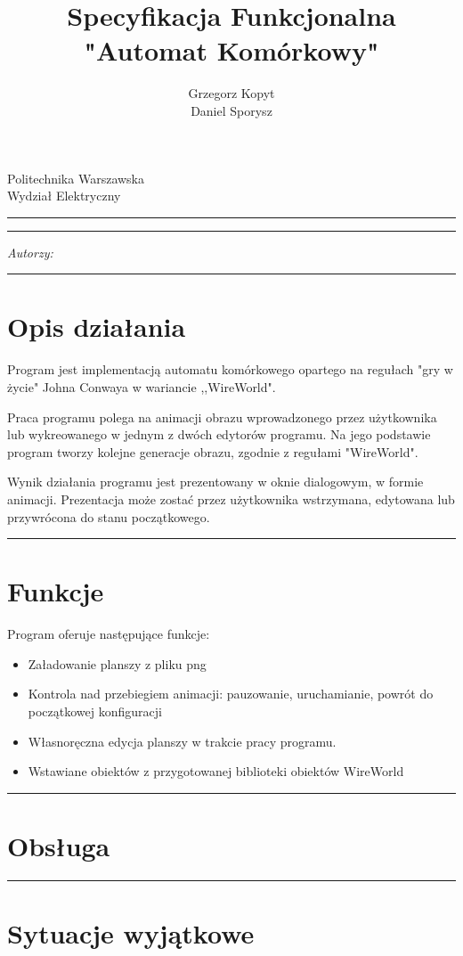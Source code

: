 \documentclass[a4paper,11pt]{article}
\author{Grzegorz Kopyt\\
Daniel Sporysz}
\title{Specyfikacja Funkcjonalna \\
"Automat Komórkowy"}
\makeatletter
\newcommand{\linia}{\rule{\linewidth}{0.4mm}}
\renewcommand{\maketitle}{\begin{titlepage}
    \vspace*{2cm}
    \begin{center}\LARGE
    Politechnika Warszawska\\
    Wydział Elektryczny\\
    \end{center}
    \vspace{5cm}
    \noindent\linia
    \begin{center}
      \LARGE \textsc{\@title}
         \end{center}
     \linia
    \vspace{0.5cm}
    \begin{flushright}
    \begin{minipage}{5cm}
    \textit{Autorzy:}\\
    \normalsize \textsc{\@author} \par
    \end{minipage}
    \vspace{5cm}
     \end{flushright}
    \vspace*{\stretch{6}}
    \begin{center}
    \@date
    \end{center}
  \end{titlepage}%
}
\makeatother
\begin{document}
\maketitle


\tableofcontents
\vspace{1cm}
\noindent\linia
\section{Opis działania}
Program jest implementacją automatu komórkowego opartego na regułach "gry w życie" Johna Conwaya w wariancie ,,WireWorld".

Praca programu polega na animacji obrazu wprowadzonego przez użytkownika lub wykreowanego w jednym z dwóch edytorów programu. Na jego podstawie program tworzy kolejne generacje obrazu, zgodnie z regułami "WireWorld".

Wynik działania programu jest prezentowany w oknie dialogowym, w formie animacji. Prezentacja może zostać przez użytkownika wstrzymana, edytowana lub przywrócona do stanu początkowego.

\noindent\linia
\section{Funkcje}
Program oferuje następujące funkcje:
\begin{itemize}
\item Załadowanie planszy z pliku png
\item Kontrola nad przebiegiem animacji: pauzowanie, uruchamianie, powrót do początkowej konfiguracji
\item Własnoręczna edycja planszy w trakcie pracy programu.
\item Wstawiane obiektów z przygotowanej biblioteki obiektów WireWorld
\end{itemize}



\noindent\linia
\section{Obsługa}



\noindent\linia
\section{Sytuacje wyjątkowe}
\end{document}
